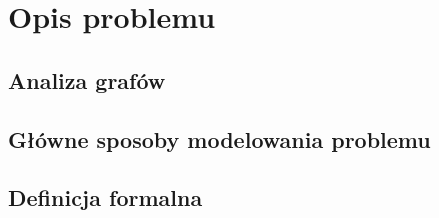 \chapter{Opis problemu}

\section{Analiza grafów}

\section{Główne sposoby modelowania problemu}

\section{Definicja formalna}